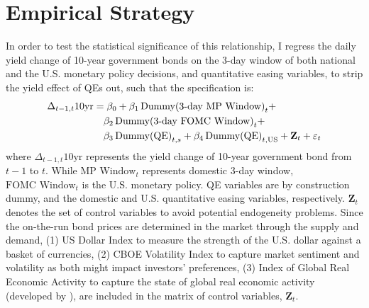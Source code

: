 \section{Empirical Strategy}

In order to test the statistical significance of this relationship, I regress the daily yield change of 10-year government bonds on the 3-day window of both national and the U.S. monetary policy decisions, and quantitative easing variables, to strip the yield effect of QEs out, such that the specification is:
\begin{align} \notag
    \Delta_{t-1, t} 10\textrm{yr} &= \beta_0 + \beta_1\, \textrm{Dummy(3-day MP Window)}_{t} + \\ \notag
    & \quad \beta_2\, \textrm{Dummy(3-day FOMC Window)}_{t} + \\ \notag
    & \quad \beta_3\, \textrm{Dummy(QE)}_{t,s} + \beta_4 \, \textrm{Dummy(QE)}_{t, \textrm{US}}+ \mathbf{Z}_t + \varepsilon_t
\end{align}
where $\Delta_{t-1, t} 10\textrm{yr}$ represents the yield change of 10-year government bond from $t-1$ to $t$. While $\textrm{MP Window}_{t}$ represents domestic 3-day window, $\textrm{FOMC Window}_{t}$ is the U.S. monetary policy. QE variables are by construction dummy, and the domestic and U.S. quantitative easing variables, respectively. $\mathbf{Z}_t$ denotes the set of control variables to avoid potential endogeneity problems. Since the on-the-run bond prices are determined in the market through the supply and demand, (1) US Dollar Index to measure the strength of the U.S. dollar against a basket of currencies, (2) CBOE Volatility Index to capture market sentiment and volatility as both might impact investors' preferences, (3) Index of Global Real Economic Activity to capture the state of global real economic activity (developed by \citet{kilian2009not, kilian2019measuring}), are included in the matrix of control variables, $\mathbf{Z}_t$.